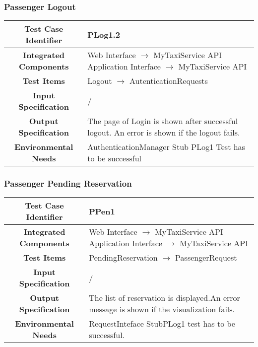 \documentclass[11pt, a4paper,titlepage]{article}
\begin{document}
	\subsubsection{Passenger Logout}
	\begin{tabularx}{\textwidth}{| c|X|}
		\hline \textbf{Test Case Identifier} & \label{PLog1.2}PLog1.2 \\
		\hline \textbf{Integrated Components} & Web Interface $\rightarrow $ MyTaxiService API \newline 
		Application Interface $\rightarrow $ MyTaxiService API \\
		\hline \textbf{Test Items} & Logout $\rightarrow $ AutenticationRequests \\
		\hline \textbf{Input Specification} & / \\
		\hline \textbf{Output Specification} & 
		The page of Login is shown after successful logout.\newline
		An error is shown if the logout fails.\\
		\hline \textbf{Environmental Needs} & AuthenticationManager Stub \newline	PLog1 Test has to be successful \\
		\hline
	\end{tabularx}
	\newline
	\newline
	\subsubsection{Passenger Pending Reservation }
	\begin{tabularx}{\textwidth}{| c|X|}
		\hline \textbf{Test Case Identifier} & \label{PPen1}PPen1 \\
		\hline \textbf{Integrated Components} & Web Interface $\rightarrow $ MyTaxiService API \newline 
		Application Interface $\rightarrow $ MyTaxiService API \\ 
		\hline \textbf{Test Items} & PendingReservation $\rightarrow $ PassengerRequest \\
		\hline \textbf{Input Specification} & / \\
		\hline \textbf{Output Specification} & The list of reservation is displayed.\newline An error message is shown if the visualization fails. \\
		\hline \textbf{Environmental Needs} & RequestInteface Stub\newline PLog1 test has to be successful. \\
		\hline
	\end{tabularx}
	\newline
	\newline
\end{document}
